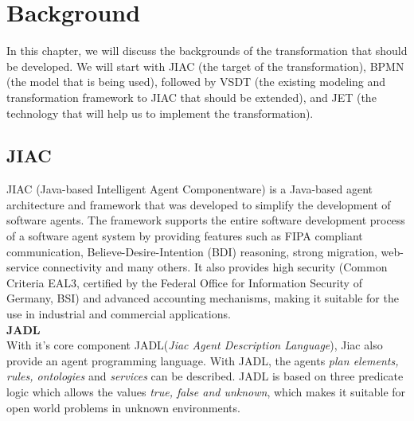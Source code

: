 \chapter{Background}

In this chapter, we will discuss the backgrounds of the transformation that should be developed. We will start with JIAC (the target of the transformation), BPMN (the model that is being used), followed by VSDT (the existing modeling and transformation framework to JIAC that should be extended), and JET (the technology that will help us to implement the transformation).

\section{JIAC}
JIAC (Java-based Intelligent Agent Componentware) is a Java-based agent architecture and framework that was developed to simplify the development of software agents\cite{JIACWEB}. The framework supports the entire software development process of a software agent system by providing features such as FIPA compliant communication, Believe-Desire-Intention (BDI) reasoning, strong migration, web-service
connectivity and many others. It also provides high security (Common Criteria EAL3,
certified by the Federal Office for Information Security of Germany, BSI) and advanced
accounting mechanisms, making it suitable for the use in industrial and
commercial applications.\\

\textbf{JADL}\\
With it's core component JADL(\textit{Jiac Agent Description Language})\cite{jadl_basic}, Jiac also provide an agent programming language. With JADL, the agents \textit{plan elements, rules, ontologies} and \textit{services} can be described. JADL is based on three predicate logic which allows the values \textit{true, false and unknown}, which makes it suitable for open world problems in unknown environments.
\\

